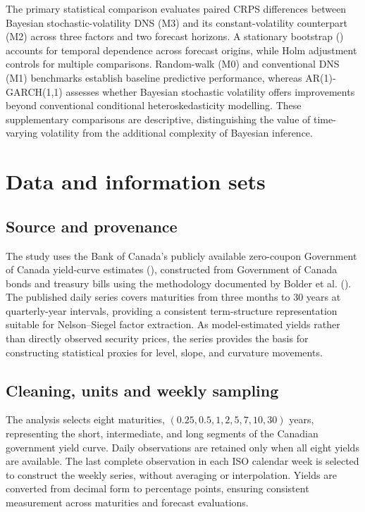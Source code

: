 \documentclass[
  12pt,
  letterpaper,
  DIV=11,
  numbers=noendperiod]{scrreprt}
\begin{document}
The primary statistical comparison evaluates paired CRPS differences
between Bayesian stochastic-volatility DNS (M3) and its
constant-volatility counterpart (M2) across three factors and two
forecast horizons. A stationary bootstrap
() accounts
for temporal dependence across forecast origins, while Holm adjustment
controls for multiple comparisons. Random-walk (M0) and conventional DNS
(M1) benchmarks establish baseline predictive performance, whereas
AR(1)-GARCH(1,1) assesses whether Bayesian stochastic volatility offers
improvements beyond conventional conditional heteroskedasticity
modelling. These supplementary comparisons are descriptive,
distinguishing the value of time-varying volatility from the additional
complexity of Bayesian inference.

\chapter{Data and information sets}\label{sec-data}

\section{Source and provenance}\label{source-and-provenance}

The study uses the Bank of Canada's publicly available zero-coupon
Government of Canada yield-curve estimates (), constructed from Government of Canada bonds and
treasury bills using the methodology documented by Bolder et al.
(). The published daily series
covers maturities from three months to 30 years at quarterly-year
intervals, providing a consistent term-structure representation suitable
for Nelson--Siegel factor extraction. As model-estimated yields rather
than directly observed security prices, the series provides the basis
for constructing statistical proxies for level, slope, and curvature
movements.

\section{Cleaning, units and weekly
sampling}\label{cleaning-units-and-weekly-sampling}

The analysis selects eight maturities,
\((0.25, 0.5, 1, 2, 5, 7, 10, 30)\) years, representing the short,
intermediate, and long segments of the Canadian government yield curve.
Daily observations are retained only when all eight yields are
available. The last complete observation in each ISO calendar week is
selected to construct the weekly series, without averaging or
interpolation. Yields are converted from decimal form to percentage
points, ensuring consistent measurement across maturities and forecast
evaluations.
\end{document}
